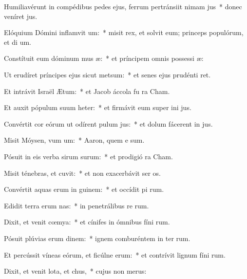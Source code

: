 \item Humiliavérunt in compédibus pedes ejus, ferrum pertránsiit nimam jus~* donec veníret  jus.
\item Elóquium Dómini inflamvit um:~* misit rex, et solvit eum; princeps populórum, et di um.
\item Constítuit eum dóminum mus æ:~* et príncipem omnis possessi æ:
\item Ut erudíret príncipes ejus sicut metsum:~* et senes ejus prudénti ret.
\item Et intrávit Israël  Ætum:~* et Jacob áccola fu  ra Cham.
\item Et auxit pópulum suum heter:~* et firmávit eum super ini jus.
\item Convértit cor eórum ut odírent pulum jus:~* et dolum fácerent in  jus.
\item Misit Móysen, vum um:~* Aaron, quem e sum.
\item Pósuit in eis verba sirum surum:~* et prodigió  ra Cham.
\item Misit ténebras, et cuvit:~* et non exacerbávit ser os.
\item Convértit aquas erum in guinem:~* et occídit pi rum.
\item Edidit terra erum nas:~* in penetrálibus re rum.
\item Dixit, et venit cœmya:~* et cínifes in ómnibus fíni rum.
\item Pósuit plúvias erum dinem:~* ignem comburéntem in ter rum.
\item Et percússit víneas eórum, et ficúlne erum:~* et contrívit lignum fíni rum.
\item Dixit, et venit lota, et chus,~* cujus non  merus:
